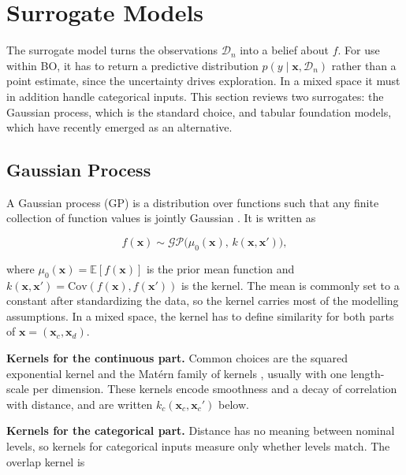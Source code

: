 \section{Surrogate Models}\label{sec:surrogate-models}

The surrogate model turns the observations $\mathcal{D}_n$ into a belief about $f$. For use within BO, it has to return a predictive distribution $p(y \mid \boldsymbol{x}, \mathcal{D}_n)$ rather than a point estimate, since the uncertainty drives exploration. In a mixed space it must in addition handle categorical inputs. This section reviews two surrogates: the Gaussian process, which is the standard choice, and tabular foundation models, which have recently emerged as an alternative.

\subsection{Gaussian Process}\label{subsec:gaussian-process}

A Gaussian process (GP) is a distribution over functions such that any finite collection of function values is jointly Gaussian \citep{rasmussen2006gaussian}. It is written as

\begin{equation}
  f(\boldsymbol{x}) \sim \mathcal{GP}\bigl(\mu_0(\boldsymbol{x}),\, k(\boldsymbol{x},\boldsymbol{x}')\bigr),
  \label{eq:gp-prior}
\end{equation}

where $\mu_0(\boldsymbol{x}) = \mathbb{E}[f(\boldsymbol{x})]$ is the prior mean function and $k(\boldsymbol{x}, \boldsymbol{x}') = \mathrm{Cov}(f(\boldsymbol{x}), f(\boldsymbol{x}'))$ is the kernel. The mean is commonly set to a constant after standardizing the data, so the kernel carries most of the modelling assumptions. In a mixed space, the kernel has to define similarity for both parts of $\boldsymbol{x} = (\boldsymbol{x}_c, \boldsymbol{x}_d)$.

\textbf{Kernels for the continuous part.} Common choices are the squared exponential kernel and the Matérn family of kernels \citep{rasmussen2006gaussian}, usually with one length-scale per dimension. These kernels encode smoothness and a decay of correlation with distance, and are written $k_c(\boldsymbol{x}_c, \boldsymbol{x}_c')$ below.

\textbf{Kernels for the categorical part.} Distance has no meaning between nominal levels, so kernels for categorical inputs measure only whether levels match. The overlap kernel \citep{pmlr-v119-ru20a} is

